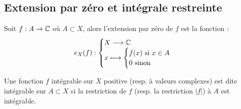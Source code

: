 \subsection{Extension par zéro et intégrale restreinte}

\begin{definition}
    Soit $f : A \rightarrow \mathbb{C}$ où $A \subset X$, alors l'extension par zéro de $f$ est la fonction :
        \[ e_X(f) : 
            \begin{cases}
                X \longrightarrow \mathbb{C} \\
                x \longmapsto \begin{cases}
                                    f(x) \text{ si } x \in A \\
                                    0 \text{ sinon }
                                \end{cases}
            \end{cases} \] 
\end{definition}

\begin{definition}
    Une fonction $f$ intégrable sur $X$ positive (resp. à valeurs complexes) est dite intégrable sur $A \subset X$ si la restriction de $f$ (resp. la restriction $|f|$) à $A$ est intégrable.
\end{definition}

\newpage 

